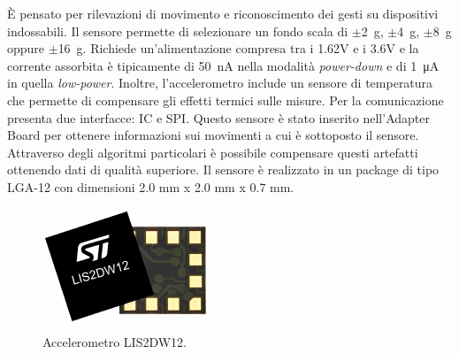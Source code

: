 \`E pensato per rilevazioni di movimento e riconoscimento dei gesti su dispositivi indossabili. Il sensore permette di selezionare un fondo scala di $\pm$\SI{2}{\gram}, $\pm$\SI{4}{\gram}, $\pm$\SI{8}{\gram} oppure $\pm$\SI{16}{\gram}. Richiede un'alimentazione compresa tra i 1.62V e i 3.6V e la corrente assorbita è tipicamente di \SI{50}{\nano\ampere} nella modalità \textit{power-down} e di \SI{1}{\micro\ampere} in quella \textit{low-power}. Inoltre, l'accelerometro include un sensore di temperatura che permette di compensare gli effetti termici sulle misure. Per la comunicazione presenta due interfacce: IC e SPI. Questo sensore è stato inserito nell'Adapter Board per ottenere informazioni sui movimenti a cui è sottoposto il sensore. Attraverso degli algoritmi particolari è possibile compensare questi artefatti ottenendo dati di qualità superiore. Il sensore è realizzato in un package di tipo LGA-12 con dimensioni 2.0 mm x 2.0 mm x 0.7 mm.
\begin{figure}[h]
	\centering
	\includegraphics[width=0.3\linewidth]{ImageFiles/Hardware/ImmagineLIS2DW12}
	\caption{Accelerometro LIS2DW12.}
	\label{fig:ImmagineLIS2DW12}
\end{figure}

